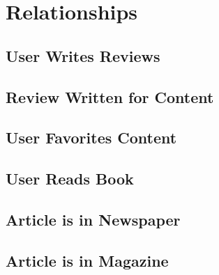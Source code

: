 \documentclass[letter, 12pt, titlepage]{article}
\begin{document}
	\section{Relationships}
		\subsection{User Writes Reviews}

		\subsection{Review Written for Content}

		\subsection{User Favorites Content}

		\subsection{User Reads Book}

		\subsection{Article is in Newspaper}

		\subsection{Article is in Magazine}
\end{document}
